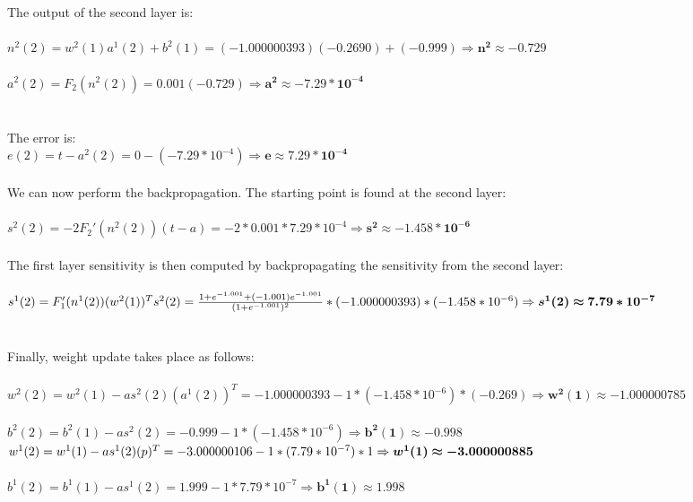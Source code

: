 \documentclass{article}
\begin{document}
\noindent \\ \\The output of the second layer is: \\ \\$n^2(2) = w^2(1)a^1(2) + b^2(1) = (-1.000000393)(-0.2690) + (-0.999) \Rightarrow \bm{n^2 \approx -0.729}$
\\ \\$a^2(2) = F_2(n^2(2)) = 0.001(-0.729) \Rightarrow \bm{a^2 \approx -7.29 * 10^{-4}}$
\\ \\ \\The error is: \\$e(2) = t - a^2(2) = 0 - (-7.29 * 10^{-4}) \Rightarrow \bm{e \approx 7.29 * 10^{-4}}$ \\\\

\noindent We can now perform the backpropagation. The starting point is found at the second layer: \\ \\
$s^2(2) = -2F_2'(n^2(2))(t-a) = -2 * 0.001 * 7.29 * 10^{-4} \Rightarrow \bm{s^2 \approx -1.458 * 10^{-6}}$
\\\\ The first layer sensitivity is then computed by backpropagating the sensitivity from the second layer: \\ \\ $s^1(2) = F_1'(n^1(2))(w^2(1))^Ts^2(2) = \frac{1+e^{-1.001}+(-1.001)e^{-1.001}}{(1+e^{-1.001})^2} * (-1.000000393) *(-1.458 * 10^{-6}) \\\Rightarrow \bm{s^1(2) \approx 7.79 * 10^{-7}}$
\\\\ \\Finally, weight update takes place as follows: \\\\
$w^2(2) = w^2(1) - as^2(2)(a^1(2))^T = -1.000000393 -1 * (-1.458 * 10 ^{-6}) * (-0.269) \Rightarrow \bm{w^2(1) \approx -1.000000785}$
\\ \\ $b^2(2) = b^2(1) -as^2(2) = -0.999 -1 * (-1.458 * 10 ^ {-6}) \Rightarrow \bm{b^2(1) \approx -0.998}$
$\\ \\ \\ w^1(2) = w^1(1) -as^1(2)(p)^T = -3.000000106 -1 * (7.79 * 10^{-7}) * 1 \Rightarrow \bm{w^1(1) \approx -3.000000885} $ 
\\ \\$b^1(2) = b^1(1) - as^1(2) = 1.999 - 1 * 7.79 * 10^{-7} \Rightarrow \bm{b^1(1) \approx 1.998}$\\ \\ \\
\end{document}
